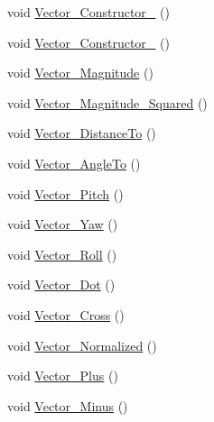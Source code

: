 \begin{DoxyCompactItemize}
\item 
void \mbox{\hyperlink{class_leap_1_1_leap_c_sharp_1_1_tests_1_1_vector_tests_a4af3d975d3572ce1b986e04f33a0d3f1}{Vector\+\_\+\+Constructor\+\_}} ()
\item 
void \mbox{\hyperlink{class_leap_1_1_leap_c_sharp_1_1_tests_1_1_vector_tests_aa0f506785e3ecc2850358f960168fed4}{Vector\+\_\+\+Constructor\+\_}} ()
\item 
void \mbox{\hyperlink{class_leap_1_1_leap_c_sharp_1_1_tests_1_1_vector_tests_a12b9148aad0254e6a0aa51f90d6ca07b}{Vector\+\_\+\+Magnitude}} ()
\item 
void \mbox{\hyperlink{class_leap_1_1_leap_c_sharp_1_1_tests_1_1_vector_tests_a31575f9e35f1950d4b0a5b6364e65bf8}{Vector\+\_\+\+Magnitude\+\_\+\+Squared}} ()
\item 
void \mbox{\hyperlink{class_leap_1_1_leap_c_sharp_1_1_tests_1_1_vector_tests_adaacfc7dece7179f4bf387f9c1071b5c}{Vector\+\_\+\+Distance\+To}} ()
\item 
void \mbox{\hyperlink{class_leap_1_1_leap_c_sharp_1_1_tests_1_1_vector_tests_a437abd3b29a1475bd61d2ec6c6c27be4}{Vector\+\_\+\+Angle\+To}} ()
\item 
void \mbox{\hyperlink{class_leap_1_1_leap_c_sharp_1_1_tests_1_1_vector_tests_a9dd3db807907c8a517f0cc825b0d38a2}{Vector\+\_\+\+Pitch}} ()
\item 
void \mbox{\hyperlink{class_leap_1_1_leap_c_sharp_1_1_tests_1_1_vector_tests_a2ffa62b560241d8c489d07c8f4d0fd39}{Vector\+\_\+\+Yaw}} ()
\item 
void \mbox{\hyperlink{class_leap_1_1_leap_c_sharp_1_1_tests_1_1_vector_tests_a824cd8e6c65420ec593e146e7027ca16}{Vector\+\_\+\+Roll}} ()
\item 
void \mbox{\hyperlink{class_leap_1_1_leap_c_sharp_1_1_tests_1_1_vector_tests_a95ef902b49770c997d4ac63c82469af4}{Vector\+\_\+\+Dot}} ()
\item 
void \mbox{\hyperlink{class_leap_1_1_leap_c_sharp_1_1_tests_1_1_vector_tests_a7ccc1b67410e1db3f7233d298713568d}{Vector\+\_\+\+Cross}} ()
\item 
void \mbox{\hyperlink{class_leap_1_1_leap_c_sharp_1_1_tests_1_1_vector_tests_af791ae55b3cdec41bf193f32f21d5995}{Vector\+\_\+\+Normalized}} ()
\item 
void \mbox{\hyperlink{class_leap_1_1_leap_c_sharp_1_1_tests_1_1_vector_tests_a831fe0bbe331497dd6be9b658aeb4198}{Vector\+\_\+\+Plus}} ()
\item 
void \mbox{\hyperlink{class_leap_1_1_leap_c_sharp_1_1_tests_1_1_vector_tests_a458591b03503cc37248e456bf914b08c}{Vector\+\_\+\+Minus}} ()

\end{DoxyCompactItemize}
